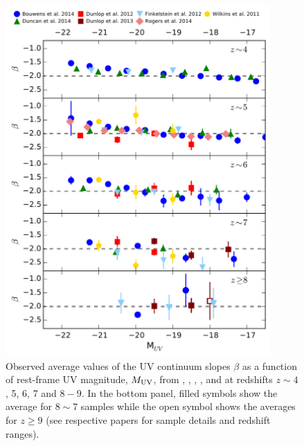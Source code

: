 \begin{figure}
\centering
  \includegraphics[width=0.9\textwidth]{plots/Fig2.pdf}
  \caption[Observed average values of the UV continuum slopes $\beta$ as a function of rest-frame UV magnitude, $M_{\rm{UV}}$ at redshifts $z\sim4$, 5, 6, 7 and $8-9$.]{Observed average values of the UV continuum slopes $\beta$ as a function of rest-frame UV magnitude, $M_{\rm{UV}}$, from \citet{Wilkins:2011fs}, \citet{Dunlop:2011jl,Dunlop:2013kp}, \citet{2012ApJ...756..164F}, \citet{Bouwens:2013vf}, \citet{Duncan:2014gh} and \citet{Rogers:2014bn} at redshifts $z\sim4$, 5, 6, 7 and $8-9$. In the bottom panel, filled symbols show the average for $8\sim7$ samples while the open symbol shows the averages for $z\geq 9$ (see respective papers for sample details and redshift ranges).}
  \label{fig:beta_z}
\end{figure}

